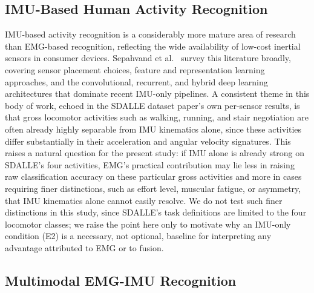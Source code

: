 \documentclass[conference]{IEEEtran}
\begin{document}
\subsection{IMU-Based Human Activity Recognition}
\label{subsec:imu-har}

IMU-based activity recognition is a considerably more mature area of
research than EMG-based recognition, reflecting the wide availability
of low-cost inertial sensors in consumer devices. Sepahvand et
al.~\cite{sepahvand2025imusurvey} survey this literature broadly,
covering sensor placement choices, feature and representation
learning approaches, and the convolutional, recurrent, and hybrid
deep learning architectures that dominate recent IMU-only pipelines.
A consistent theme in this body of work, echoed in the SDALLE
dataset paper's own per-sensor results, is that gross locomotor
activities such as walking, running, and stair negotiation are
often already highly separable from IMU kinematics alone, since
these activities differ substantially in their acceleration and
angular velocity signatures. This raises a natural question for the
present study: if IMU alone is already strong on SDALLE's four
activities, EMG's practical contribution may lie less in raising
raw classification accuracy on these particular gross activities and
more in cases requiring finer distinctions, such as effort level,
muscular fatigue, or asymmetry, that IMU kinematics alone cannot
easily resolve. We do not test such finer distinctions in this
study, since SDALLE's task definitions are limited to the four
locomotor classes; we raise the point here only to motivate why an
IMU-only condition (E2) is a necessary, not optional, baseline for
interpreting any advantage attributed to EMG or to fusion.

\subsection{Multimodal EMG-IMU Recognition}
\label{subsec:fusion-related}
\end{document}
